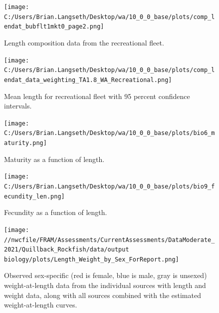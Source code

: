 \documentclass[11pt,
  english,
  letterpaper,
]{article}
\begin{document}
\begin{figure}
\centering
\texttt{[image: C:/Users/Brian.Langseth/Desktop/wa/10\_0\_0\_base/plots/comp\_lendat\_bubflt1mkt0\_page2.png]}
\caption{Length composition data from the recreational fleet.\label{fig:rec-len-data}}
\end{figure}

\tagmcend\tagstructend


\begin{figure}
\centering
\texttt{[image: C:/Users/Brian.Langseth/Desktop/wa/10\_0\_0\_base/plots/comp\_lendat\_data\_weighting\_TA1.8\_WA\_Recreational.png]}
\caption{Mean length for recreational fleet with 95 percent confidence intervals.\label{fig:mean-rec-len-data}}
\end{figure}

\tagmcend\tagstructend


\begin{figure}
\centering
\texttt{[image: C:/Users/Brian.Langseth/Desktop/wa/10\_0\_0\_base/plots/bio6\_maturity.png]}
\caption{Maturity as a function of length.\label{fig:maturity}}
\end{figure}

\tagmcend\tagstructend


\begin{figure}
\centering
\texttt{[image: C:/Users/Brian.Langseth/Desktop/wa/10\_0\_0\_base/plots/bio9\_fecundity\_len.png]}
\caption{Fecundity as a function of length.\label{fig:fecundity}}
\end{figure}

\tagmcend\tagstructend


\begin{figure}
\centering
\texttt{[image: //nwcfile/FRAM/Assessments/CurrentAssessments/DataModerate\_2021/Quillback\_Rockfish/data/output biology/plots/Length\_Weight\_by\_Sex\_ForReport.png]}
\caption{Observed sex-specific (red is female, blue is male, gray is unsexed) weight-at-length data from the individual sources with length and weight data, along with all sources combined with the estimated weight-at-length curves.\label{fig:len-weight-survey}}
\end{figure}
\end{document}

